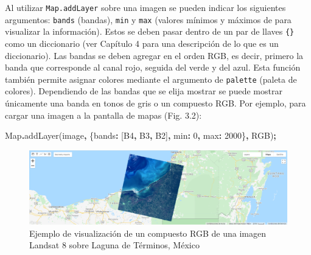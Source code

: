 \documentclass[
  12pt,
  letterpaper,
  twoside]{book}
\newenvironment{Shaded}{\begin{snugshade}}{\end{snugshade}}
\newcommand{\BuiltInTok}[1]{#1}
\newcommand{\DataTypeTok}[1]{\textcolor[rgb]{0.13,0.29,0.53}{#1}}
\newcommand{\DecValTok}[1]{\textcolor[rgb]{0.00,0.00,0.81}{#1}}
\newcommand{\FunctionTok}[1]{\textcolor[rgb]{0.00,0.00,0.00}{#1}}
\newcommand{\NormalTok}[1]{#1}
\newcommand{\OperatorTok}[1]{\textcolor[rgb]{0.81,0.36,0.00}{\textbf{#1}}}
\newcommand{\StringTok}[1]{\textcolor[rgb]{0.31,0.60,0.02}{#1}}
\begin{document}
Al utilizar \texttt{Map.addLayer} sobre una imagen se pueden indicar los siguientes argumentos: \texttt{bands} (bandas), \texttt{min} y \texttt{max} (valores mínimos y máximos de para visualizar la información). Estos se deben pasar dentro de un par de llaves \texttt{\{\}} como un diccionario (ver Capítulo 4 para una descripción de lo que es un diccionario). Las bandas se deben agregar en el orden RGB, es decir, primero la banda que corresponde al canal rojo, seguida del verde y del azul. Esta función también permite asignar colores mediante el argumento de \texttt{palette} (paleta de colores). Dependiendo de las bandas que se elija mostrar se puede mostrar únicamente una banda en tonos de gris o un compuesto RGB. Por ejemplo, para cargar una imagen a la pantalla de mapas (Fig. 3.2):

\begin{Shaded}
\begin{Highlighting}[]
\BuiltInTok{Map}\OperatorTok{.}\FunctionTok{addLayer}\NormalTok{(image}\OperatorTok{,}\NormalTok{ \{}\DataTypeTok{bands}\OperatorTok{:}\NormalTok{ [}\StringTok{\textquotesingle{}B4\textquotesingle{}}\OperatorTok{,} \StringTok{\textquotesingle{}B3\textquotesingle{}}\OperatorTok{,} \StringTok{\textquotesingle{}B2\textquotesingle{}}\NormalTok{]}\OperatorTok{,} 
                      \DataTypeTok{min}\OperatorTok{:} \DecValTok{0}\OperatorTok{,} \DataTypeTok{max}\OperatorTok{:} \DecValTok{2000}\NormalTok{\}}\OperatorTok{,} 
                      \StringTok{\textquotesingle{}RGB\textquotesingle{}}\NormalTok{)}\OperatorTok{;}
\end{Highlighting}
\end{Shaded}

\begin{figure}[btp]

{\centering \includegraphics[width=1\linewidth]{Img/LTerminos} 

}

\caption{Ejemplo de visualización de un compuesto RGB de una imagen Landsat 8 sobre Laguna de Términos, México}\label{fig:unnamed-chunk-27}
\end{figure}
\end{document}
